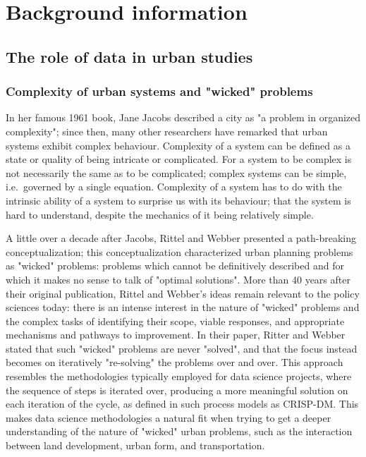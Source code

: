 \chapter[Background information]{Background information} \label{ch:background}

\section{The role of data in urban studies} \label{sec:role_of_data_in_urban_studies}

\subsection{Complexity of urban systems and "wicked" problems} \label{subsec:complexity_and_wicked_problems}

In her famous 1961 book, Jane Jacobs\cite{Jacobs1961} described a city as "a problem in organized complexity";
since then, many other researchers have remarked that urban systems exhibit complex behaviour\cite{Batty2008, Bettencourt2013}.
Complexity of a system can be defined as a state or quality of being intricate or complicated.
For a system to be complex is not necessarily the same as to be complicated;
complex systems can be simple, i.e.\ governed by a single equation.
Complexity of a system has to do with the intrinsic ability of a system to surprise us with its behaviour;
that the system is hard to understand, despite the mechanics of it being relatively simple.

A little over a decade after Jacobs, Rittel and Webber\cite{Rittel1973} presented a path-breaking conceptualization;
this conceptualization characterized urban planning problems as "wicked" problems: problems which cannot be definitively described and for which it makes no sense to talk of "optimal solutions".
More than 40 years after their original publication, Rittel and Webber's ideas remain relevant to the policy sciences today: there is an intense interest in the nature of "wicked" problems and the complex tasks of identifying their scope, viable responses, and appropriate mechanisms and pathways to improvement\cite{Crowley2017}.
In their paper, Ritter and Webber stated that such "wicked" problems are never "solved", and that the focus instead becomes on iteratively "re-solving" the problems over and over.
This approach resembles the methodologies typically employed for data science projects, where the sequence of steps is iterated over, producing a more meaningful solution on each iteration of the cycle, as defined in such process models as CRISP-DM\cite{Shearer2000}.
This makes data science methodologies a natural fit when trying to get a deeper understanding of the nature of "wicked" urban problems, such as the interaction between land development, urban form, and transportation.

